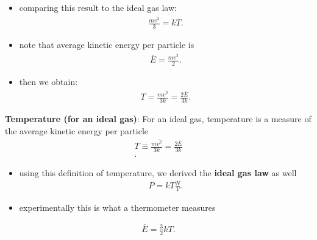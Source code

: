 \documentclass[10pt]{article}
\begin{document}
\begin{itemize}
    \item comparing this result to the ideal gas law:
    \begin{align*}
        \frac{m\overline{v^2}}{3} = kT
    .\end{align*}
\item note that average kinetic energy per particle is
    \begin{align*}
        \overline{E} = \frac{m\overline{v^2}}{2}
    .\end{align*}
\item then we obtain:
    \begin{align*}
        T = \frac{m\overline{v^2}}{3k} = \frac{2\overline{E}}{3k}
    .\end{align*}
\end{itemize}

\begin{definition}
    \textbf{Temperature (for an ideal gas)}: For an ideal gas, temperature is a measure of the average kinetic energy per particle
    \begin{align*}
        T \equiv \frac{m\overline{v^2}}{3k} = \frac{2\overline{E}}{3k} \\
    .\end{align*}
    \begin{itemize}
        \item using this definition of temperature, we derived the \textbf{ideal gas law}  as well
            \begin{gather*}
                P = kT \frac{N}{V}
            .\end{gather*}
        \item experimentally this is what a thermometer measures
    \end{itemize}
    \begin{align*}
        \overline{E} = \frac{3}{2}kT
    .\end{align*}
\end{definition}
\end{document}
